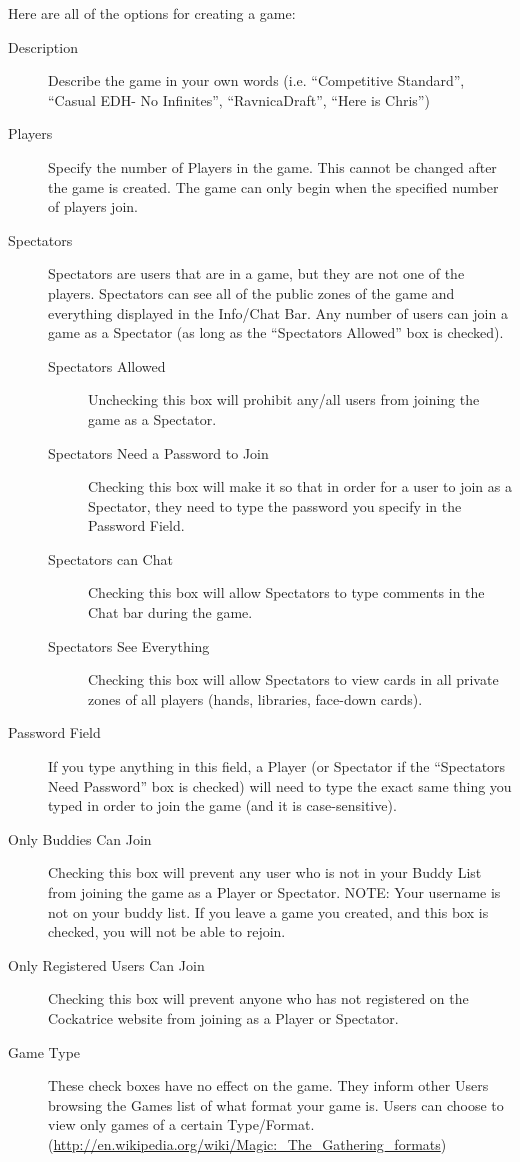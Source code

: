 \documentclass[a4paper]{scrbook}
\begin{document}
Here are all of the options for creating a game:
\begin{description}
 \item[Description] Describe the game in your own words (i.e. “Competitive Standard”, “Casual EDH- No Infinites”, “RavnicaDraft”, “Here is Chris”)
 \item[Players] Specify the number of Players in the game. This cannot be changed after the game is created. The game can only begin when the specified number of players join.
 \item[Spectators] Spectators are users that are in a game, but they are not one of the players. Spectators can see all of the public zones of the game and everything displayed in the Info/Chat Bar. Any number of users can join a game as a Spectator (as long as the “Spectators Allowed” box is checked).
 \begin{description}
  \item[Spectators Allowed] Unchecking this box will prohibit any/all users from joining the game as a Spectator.
  \item[Spectators Need a Password to Join] Checking this box will make it so that in order for a user to join as a Spectator, they need to type the password you specify in the Password Field.
  \item[Spectators can Chat] Checking this box will allow Spectators to type comments in the Chat bar during the game.
  \item[Spectators See Everything] Checking this box will allow Spectators to view cards in all private zones of all players (hands, libraries, face-down cards).
 \end{description}
 \item[Password Field] If you type anything in this field, a Player (or Spectator if the “Spectators Need Password” box is checked) will need to type the exact same thing you typed in order to join the game (and it is case-sensitive).
 \item[Only Buddies Can Join] Checking this box will prevent any user who is not in your Buddy List from joining the game as a Player or Spectator. NOTE: Your username is not on your buddy list. If you leave a game you created, and this box is checked, you will not be able to rejoin.
 \item[Only Registered Users Can Join] Checking this box will prevent anyone who has not registered on the Cockatrice website from joining as a Player or Spectator.
 \item[Game Type] These check boxes have no effect on the game. They inform other Users browsing the Games list of what format your game is. Users can choose to view only games of a certain Type/Format. (\url{http://en.wikipedia.org/wiki/Magic:_The_Gathering_formats})
\end{description}
\end{document}
